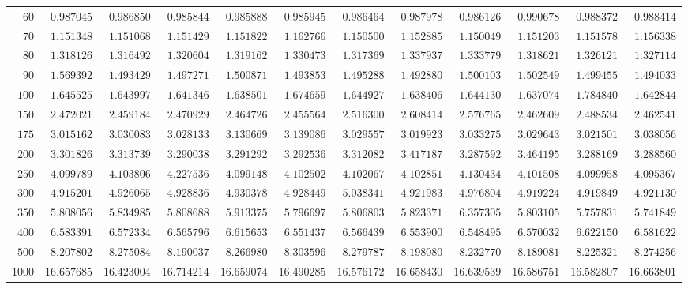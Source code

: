 \begin{sidewaystable}
\begin{tabular}{r|rrrrrrrrrrr}
$60$ & $0.987045$ & $0.986850$ & $0.985844$ & $0.985888$ & $0.985945$ & $0.986464$ & $0.987978$ & $0.986126$ & $0.990678$ & $0.988372$ & $0.988414$ \\
$70$ & $1.151348$ & $1.151068$ & $1.151429$ & $1.151822$ & $1.162766$ & $1.150500$ & $1.152885$ & $1.150049$ & $1.151203$ & $1.151578$ & $1.156338$ \\
$80$ & $1.318126$ & $1.316492$ & $1.320604$ & $1.319162$ & $1.330473$ & $1.317369$ & $1.337937$ & $1.333779$ & $1.318621$ & $1.326121$ & $1.327114$ \\
$90$ & $1.569392$ & $1.493429$ & $1.497271$ & $1.500871$ & $1.493853$ & $1.495288$ & $1.492880$ & $1.500103$ & $1.502549$ & $1.499455$ & $1.494033$ \\
$100$ & $1.645525$ & $1.643997$ & $1.641346$ & $1.638501$ & $1.674659$ & $1.644927$ & $1.638406$ & $1.644130$ & $1.637074$ & $1.784840$ & $1.642844$ \\
$150$ & $2.472021$ & $2.459184$ & $2.470929$ & $2.464726$ & $2.455564$ & $2.516300$ & $2.608414$ & $2.576765$ & $2.462609$ & $2.488534$ & $2.462541$ \\
$175$ & $3.015162$ & $3.030083$ & $3.028133$ & $3.130669$ & $3.139086$ & $3.029557$ & $3.019923$ & $3.033275$ & $3.029643$ & $3.021501$ & $3.038056$ \\
$200$ & $3.301826$ & $3.313739$ & $3.290038$ & $3.291292$ & $3.292536$ & $3.312082$ & $3.417187$ & $3.287592$ & $3.464195$ & $3.288169$ & $3.288560$ \\
$250$ & $4.099789$ & $4.103806$ & $4.227536$ & $4.099148$ & $4.102502$ & $4.102067$ & $4.102851$ & $4.130434$ & $4.101508$ & $4.099958$ & $4.095367$ \\
$300$ & $4.915201$ & $4.926065$ & $4.928836$ & $4.930378$ & $4.928449$ & $5.038341$ & $4.921983$ & $4.976804$ & $4.919224$ & $4.919849$ & $4.921130$ \\
$350$ & $5.808056$ & $5.834985$ & $5.808688$ & $5.913375$ & $5.796697$ & $5.806803$ & $5.823371$ & $6.357305$ & $5.803105$ & $5.757831$ & $5.741849$ \\
$400$ & $6.583391$ & $6.572334$ & $6.565796$ & $6.615653$ & $6.551437$ & $6.566439$ & $6.553900$ & $6.548495$ & $6.570032$ & $6.622150$ & $6.581622$ \\
$500$ & $8.207802$ & $8.275084$ & $8.190037$ & $8.266980$ & $8.303596$ & $8.279787$ & $8.198080$ & $8.232770$ & $8.189081$ & $8.225321$ & $8.274256$ \\
$1000$ & $16.657685$ & $16.423004$ & $16.714214$ & $16.659074$ & $16.490285$ & $16.576172$ & $16.658430$ & $16.639539$ & $16.586751$ & $16.582807$ & $16.663801$ \\
\hline
\end{tabular}
\end{sidewaystable}
 
